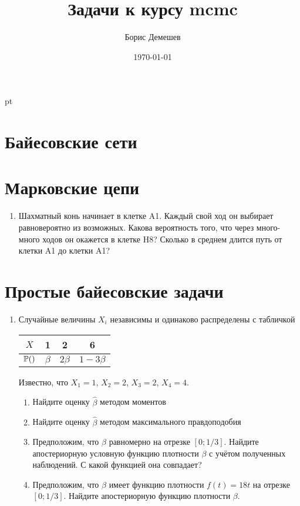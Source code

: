 \documentclass[pdftex,12pt,a4paper]{article}
\title{Задачи к курсу mcmc}
\author{Борис Демешев}
\date{\today}
\newcommand{\solution}[1]{}
\begin{document}
 pt %

\section{Байесовские сети}


\section{Марковские цепи}
\begin{enumerate}
\item Шахматный конь начинает в клетке A1. Каждый свой ход он выбирает равновероятно из возможных. Какова вероятность того, что через много-много ходов он окажется в клетке H8? Сколько в среднем длится путь от клетки A1 до клетки A1?
\end{enumerate}
\solution{}

\section{Простые байесовские задачи}
\begin{enumerate}
\item Случайные величины $X_i$ независимы и одинаково распределены с табличкой

\begin{tabular}{c|ccc}
$X$ & 1 & 2 & 6 \\ 
\hline 
$\P()$ & $\beta$ & $2\beta$ & $1-3\beta$ \\ 
\end{tabular} 

Известно, что $X_1=1$, $X_2=2$, $X_3=2$, $X_4=4$. 
\begin{enumerate}
\item Найдите оценку $\hat{\beta}$ методом моментов
\item Найдите оценку $\hat{\beta}$ методом максимального правдоподобия
\item Предположим, что $\beta$ равномерно на отрезке $[0;1/3]$. Найдите апостериорную условную функцию плотности $\beta$ с учётом полученных наблюдений. С какой функцией она совпадает?
\item Предположим, что $\beta$ имеет функцию плотности $f(t)=18t$ на отрезке $[0;1/3]$. Найдите апостериорную функцию плотности $\beta$. 
\end{enumerate}



\end{enumerate}
\end{document}
